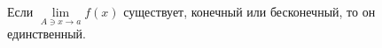 \label{edprmn}
    Если $\lim\limits_{A\ni x\to a}f(x)$ существует, конечный или бесконечный, то он единственный.
            